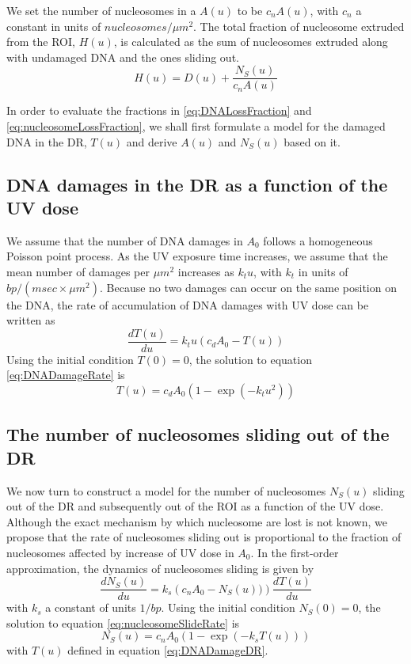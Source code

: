 \documentclass[12pt]{article}
\begin{document}
	We set the number of nucleosomes in a $A(u)$ to be $c_nA(u)$, with $c_n$ a constant in units of $nucleosomes/\mu m^2$. The total fraction of nucleosome extruded from the ROI, $H(u)$, is calculated as the sum of nucleosomes extruded along with undamaged DNA and the ones sliding out.
	\begin{equation}\label{eq:nucleosomeLossFraction}
	H(u) = D(u) + \frac{N_S(u)}{c_nA(u)}	
	\end{equation}
	
	In order to evaluate the fractions in \eqref{eq:DNALossFraction} and \eqref{eq:nucleosomeLossFraction}, we shall first formulate a model for the damaged DNA in the DR, $T(u)$ and derive $A(u)$ and $N_S(u)$ based on it.
	
	\subsection{DNA damages in the DR as a function of the UV dose}\label{subsection:AccumulationOfDNADamagesInTheDR}
	 We assume that the number of DNA damages in $A_0$ follows a homogeneous Poisson point process. As the UV exposure time increases, we assume that the mean number of damages per $\mu m^2$ increases as $k_tu$, with $k_t$ in units of $bp/(msec\times \mu m^2)$. Because no two damages can occur on the same position on the DNA, the rate of accumulation of DNA damages with UV dose can be written as
	\begin{equation}\label{eq:DNADamageRate}
	\frac{dT(u)}{du} = k_tu(c_dA_0 - T(u))
	\end{equation}	
	 Using the initial condition $T(0) = 0$, the solution to equation \eqref{eq:DNADamageRate} is
	\begin{equation}\label{eq:DNADamageDR}
		T(u) = c_dA_0(1-\exp(-k_tu^2))
	\end{equation}
	
	\subsection{The number of nucleosomes sliding out of the DR}
	We now turn to construct a model for the number of nucleosomes $N_S(u)$
	sliding out of the DR and subsequently out of the ROI as a function of the UV dose. Although the exact mechanism by which nucleosome are lost is not known, 
	we propose that the rate of nucleosomes sliding out is proportional to the fraction of nucleosomes affected by increase of UV dose in $A_0$. In the first-order approximation, the dynamics of nucleosomes sliding is given by
	\begin{equation}\label{eq:nucleosomeSlideRate}
	\frac{dN_S(u)}{du} = k_s\left(c_nA_0-N_S(u))\right)\frac{dT(u)}{du}	 
	\end{equation}
	with $k_s$ a constant of units $1/bp$. Using the initial condition $N_S(0)=0$, the solution to equation \eqref{eq:nucleosomeSlideRate} is 
	\begin{equation}\label{eq:nucleosomeSlideDR}
	N_S(u)= c_nA_0\left(1-\exp(-k_sT(u))\right)
	\end{equation}
	with $T(u)$ defined in equation \eqref{eq:DNADamageDR}.
\end{document}
